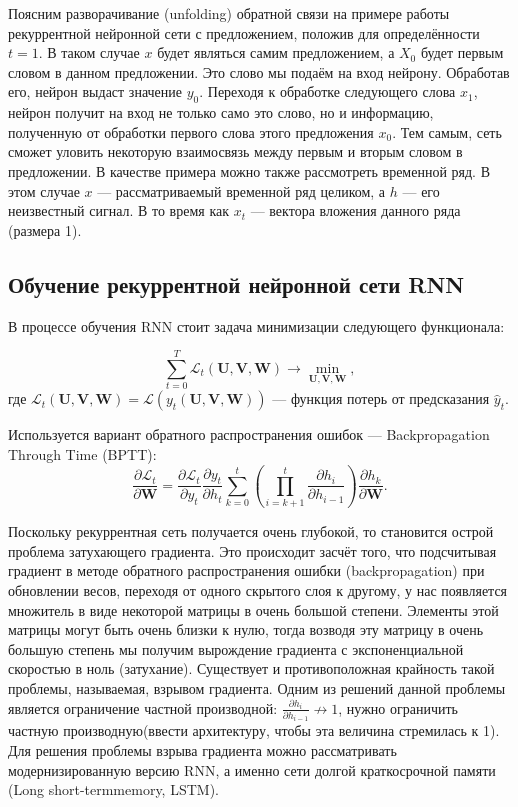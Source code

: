\documentclass{article}
\begin{document}
Поясним разворачивание (unfolding) обратной связи на примере работы рекуррентной нейронной сети с предложением, положив для определённости $t = 1$. В таком случае $x$ будет являться самим предложением, а $X_0$ будет первым словом в данном предложении. Это слово мы подаём на вход нейрону. Обработав его, нейрон выдаст значение $y_0$.
Переходя к обработке следующего слова $x_1$, нейрон получит на вход не только само это
слово, но и информацию, полученную от обработки первого слова этого предложения
$x_0$. Тем самым, сеть сможет уловить некоторую взаимосвязь между первым и вторым
словом в предложении. В качестве примера можно также рассмотреть временной ряд.
В этом случае $x$ — рассматриваемый временной ряд целиком, а $h$ — его неизвестный
сигнал. В то время как $x_t$ — вектора вложения данного ряда (размера 1).
\subsection{Обучение рекуррентной нейронной сети RNN}	
В процессе обучения RNN стоит задача минимизации следующего функционала:

\begin{equation*}
\sum_{t=0}^{T} \mathcal{L}_t (\mathbf{U}, \mathbf{V}, \mathbf{W}) \rightarrow \min_{\mathbf{U},\mathbf{ V}, \mathbf{W}},
\end{equation*}
где $\mathcal{L}_t (\mathbf{U}, \mathbf{V}, \mathbf{W}) = \mathcal{L} (y_t(\mathbf{U}, \mathbf{V}, \mathbf{W}))$ --- функция потерь от предсказания $\hat{y}_t$.

Используется вариант обратного распространения ошибок --- Backpropagation Through Time (BPTT):
\begin{equation*}
\dfrac{\partial \mathcal{L}_t}{\partial \mathbf{W}} = \dfrac{\partial \mathcal{L}_t}{\partial y_t} \dfrac{\partial y_t}{\partial h_t} \sum_{k=0}^t \left( \prod_{i = k + 1}^t \dfrac{\partial h_i}{\partial h_{i-1}} \right) \dfrac{\partial h_k}{\partial \mathbf{W}}.
\end{equation*}

Поскольку рекуррентная сеть получается очень глубокой, то становится острой
проблема затухающего градиента. Это происходит засчёт того, что подсчитывая градиент в методе обратного распространения ошибки (backpropagation) при обновлении
весов, переходя от одного скрытого слоя к другому, у нас появляется множитель в виде некоторой матрицы в очень большой степени. Элементы этой матрицы могут быть очень близки к нулю, тогда возводя эту матрицу в очень большую степень мы получим
вырождение градиента с экспоненциальной скоростью в ноль (затухание). Существует и
противоположная крайность такой проблемы, называемая, взрывом градиента. Одним
из решений данной проблемы является ограничение частной производной: $\frac{\partial h_i}{\partial h_{i-1}}\nrightarrow 1$, нужно ограничить частную производную(ввести архитектуру, чтобы эта величина стремилась к 1).
Для решения проблемы взрыва градиента можно рассматривать модернизированную версию RNN, а именно сети долгой краткосрочной памяти (Long short-termmemory, LSTM).
\end{document}
